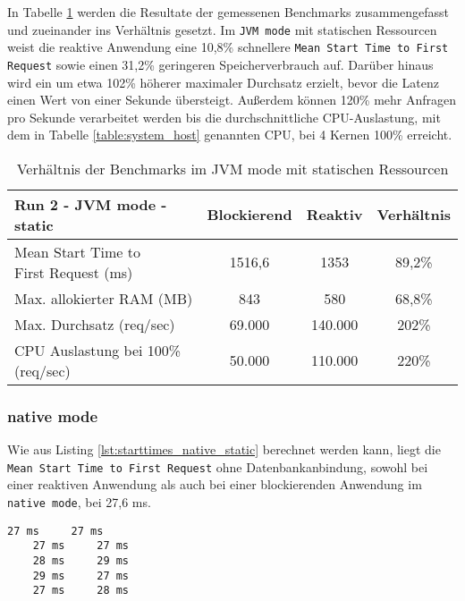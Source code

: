 In Tabelle \ref{table:static_jvm_measurement_results} werden die Resultate der gemessenen Benchmarks zusammengefasst
und zueinander ins Verhältnis gesetzt.
Im \verb|JVM mode| mit statischen Ressourcen weist die reaktive Anwendung eine 10,8\% schnellere \verb|Mean Start Time to First Request|
sowie einen 31,2\% geringeren Speicherverbrauch auf.
Darüber hinaus wird ein um etwa 102\% höherer maximaler Durchsatz erzielt, bevor die Latenz einen Wert von einer Sekunde übersteigt.
Außerdem können 120\% mehr Anfragen pro Sekunde verarbeitet werden bis die durchschnittliche CPU-Auslastung, mit dem in Tabelle
\ref{table:system_host} genannten CPU, bei 4 Kernen 100\% erreicht.

\begin{table}[ht!]
  \begin{tabular}{|l | c | c | c|}
    \hline
    Run 2 - JVM mode - static & Blockierend & Reaktiv & Verhältnis \\
    \hline
    \makecell[l]{Mean Start Time to                                \\ First Request (ms)} & 1516,6      & 1353  & 89,2\%     \\
    \hline
    Max. allokierter RAM (MB) & 843         & 580     & 68,8\%     \\
    \hline
    Max. Durchsatz (req/sec)  & 69.000      & 140.000 & 202\%      \\
    \hline
    \makecell[l]{CPU Auslastung bei 100\%                          \\ (req/sec)} & 50.000 & 110.000 & 220\%  \\
    \hline
  \end{tabular}
  \caption{Verhältnis der Benchmarks im JVM mode mit statischen Ressourcen}
  \label{table:static_jvm_measurement_results}
\end{table}

\subsubsection{native mode}
\label{subsubsec:static_native_mode}
Wie aus Listing \ref{lst:starttimes_native_static} berechnet werden kann, liegt die \verb|Mean Start Time to First Request|
ohne Datenbankanbindung, sowohl bei einer reaktiven Anwendung als auch bei einer blockierenden
Anwendung im \verb|native mode|, bei 27,6 ms.
\begin{lstlisting}[caption=Startzeiten im native mode mit statischen Ressourcen, captionpos=b, label=lst:starttimes_native_static]
    27 ms     27 ms
    27 ms     27 ms
    28 ms     29 ms
    29 ms     27 ms
    27 ms     28 ms
\end{lstlisting}

